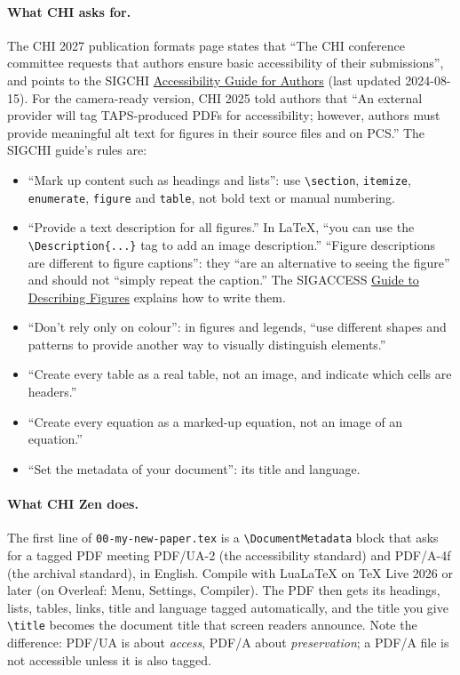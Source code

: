 \paragraph{What CHI asks for.} The CHI 2027 publication formats page states that ``The CHI conference committee requests that authors ensure basic accessibility of their submissions'', and points to the SIGCHI \href{https://sigchi.org/resources/guides-for-authors/accessibility/}{Accessibility Guide for Authors} (last updated 2024-08-15). For the camera-ready version, CHI 2025 told authors that ``An external provider will tag TAPS-produced PDFs for accessibility; however, authors must provide meaningful alt text for figures in their source files and on PCS.'' The SIGCHI guide's rules are:
\begin{itemize}
    \item ``Mark up content such as headings and lists'': use \texttt{\textbackslash section}, \texttt{itemize}, \texttt{enumerate}, \texttt{figure} and \texttt{table}, not bold text or manual numbering.
    \item ``Provide a text description for all figures.'' In \LaTeX, ``you can use the \texttt{\textbackslash Description\{...\}} tag to add an image description.'' ``Figure descriptions are different to figure captions'': they ``are an alternative to seeing the figure'' and should not ``simply repeat the caption.'' The SIGACCESS \href{https://www.sigaccess.org/welcome-to-sigaccess/resources/describing-figures/}{Guide to Describing Figures} explains how to write them.
    \item ``Don't rely only on colour'': in figures and legends, ``use different shapes and patterns to provide another way to visually distinguish elements.''
    \item ``Create every table as a real table, not an image, and indicate which cells are headers.''
    \item ``Create every equation as a marked-up equation, not an image of an equation.''
    \item ``Set the metadata of your document'': its title and language.
\end{itemize}

\paragraph{What CHI Zen does.} The first line of \texttt{00-my-new-paper.tex} is a \texttt{\textbackslash DocumentMetadata} block that asks for a tagged PDF meeting PDF/UA-2 (the accessibility standard) and PDF/A-4f (the archival standard), in English. Compile with LuaLaTeX on TeX Live 2026 or later (on Overleaf: Menu, Settings, Compiler). The PDF then gets its headings, lists, tables, links, title and language tagged automatically, and the title you give \texttt{\textbackslash title} becomes the document title that screen readers announce. Note the difference: PDF/UA is about \emph{access}, PDF/A about \emph{preservation}; a PDF/A file is not accessible unless it is also tagged.

